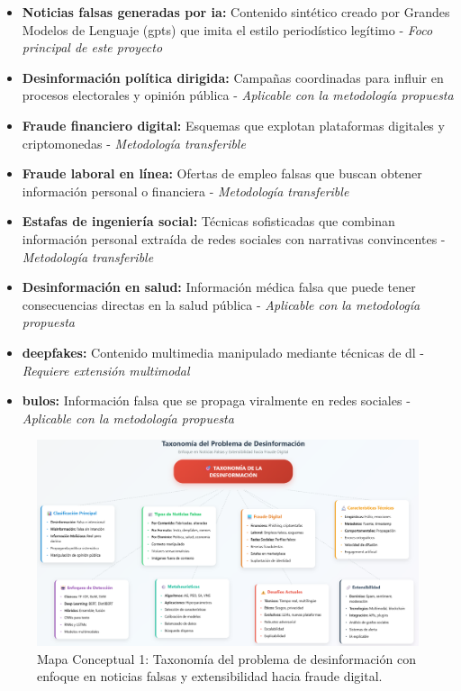 \begin{itemize}
    \item \textbf{Noticias falsas generadas por \gls{ia}:} Contenido sintético creado por Grandes Modelos de Lenguaje (\glspl{gpt}) que imita el estilo periodístico legítimo \cite{su2023fake} - \textit{Foco principal de este proyecto}
    \item \textbf{Desinformación política dirigida:} Campañas coordinadas para influir en procesos electorales y opinión pública \cite{carcamo2021fake} - \textit{Aplicable con la metodología propuesta}
    \item \textbf{Fraude financiero digital:} Esquemas que explotan plataformas digitales y criptomonedas \cite{cao2020corporate} - \textit{Metodología transferible}
    \item \textbf{Fraude laboral en línea:} Ofertas de empleo falsas que buscan obtener información personal o financiera \cite{nasser2021online} - \textit{Metodología transferible}
    \item \textbf{Estafas de ingeniería social:} Técnicas sofisticadas que combinan información personal extraída de redes sociales con narrativas convincentes - \textit{Metodología transferible}
    \item \textbf{Desinformación en salud:} Información médica falsa que puede tener consecuencias directas en la salud pública \cite{pulido2020new} - \textit{Aplicable con la metodología propuesta}
    \item \textbf{\Glspl{deepfake}:} Contenido multimedia manipulado mediante técnicas de \gls{dl} - \textit{Requiere extensión multimodal}
    \item \textbf{\Glspl{bulo}:} Información falsa que se propaga viralmente en redes sociales - \textit{Aplicable con la metodología propuesta}
\end{itemize}

\begin{figure}[h!]
    \centering
    \includegraphics[width=\textwidth]{Imagenes/mapaConceptual1.png}
    \caption{Mapa Conceptual 1: Taxonomía del problema de desinformación con enfoque en noticias falsas y extensibilidad hacia fraude digital.}
    \label{fig:mapa_problema}
\end{figure}

